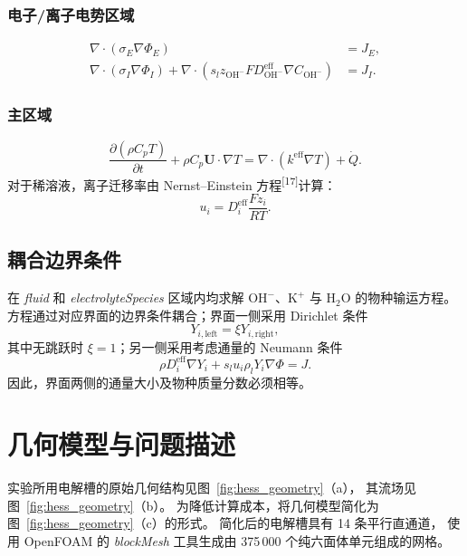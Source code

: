 \documentclass[UTF8,zihao=-4,fontset=fandol]{ctexart}
\newcommand{\vect}[1]{\bm{#1}}
\begin{document}
\subsubsection{电子/离子电势区域}
\begin{align}
\nabla\cdot(\sigma_E\nabla\Phi_E)&=J_E, \tag{8}\\
\nabla\cdot(\sigma_I\nabla\Phi_I)+
\nabla\cdot\!\left(s_lz_{\mathrm{OH^-}}FD_{\mathrm{OH^-}}^{\mathrm{eff}}
\nabla C_{\mathrm{OH^-}}\right)&=J_I. \tag{9}
\end{align}

\subsubsection{主区域}
\begin{equation}
\frac{\partial(\rho C_pT)}{\partial t}+\rho C_p\vect{U}\cdot\nabla T
=\nabla\cdot(k^{\mathrm{eff}}\nabla T)+\dot Q. \tag{10}
\end{equation}
对于稀溶液，离子迁移率由 Nernst--Einstein 方程\textsuperscript{[17]}计算：
\begin{equation}
u_i=D_i^{\mathrm{eff}}\frac{Fz_i}{RT}. \tag{11}
\end{equation}

\subsection{耦合边界条件}

在 \emph{fluid} 和 \emph{electrolyteSpecies} 区域内均求解
\(\mathrm{OH^-}\)、\(\mathrm{K^+}\) 与 \(\mathrm{H_2O}\) 的物种输运方程。
方程通过对应界面的边界条件耦合；界面一侧采用 Dirichlet 条件
\begin{equation}
Y_{i,\mathrm{left}}=\xi Y_{i,\mathrm{right}}, \tag{12}
\end{equation}
其中无跳跃时 \(\xi=1\)；另一侧采用考虑通量的 Neumann 条件
\begin{equation}
\rho D_i^{\mathrm{eff}}\nabla Y_i+s_lu_i\rho_lY_i\nabla\Phi=J. \tag{13}
\end{equation}
因此，界面两侧的通量大小及物种质量分数必须相等。

\section{几何模型与问题描述}

实验所用电解槽的原始几何结构见图~\ref{fig:hess_geometry}（a），
其流场见图~\ref{fig:hess_geometry}（b）。
为降低计算成本，将几何模型简化为图~\ref{fig:hess_geometry}（c）的形式。
简化后的电解槽具有 14 条平行直通道，
使用 OpenFOAM 的 \emph{blockMesh} 工具生成由 375\,000 个纯六面体单元组成的网格。
\end{document}
